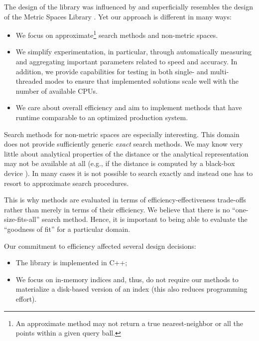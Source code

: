 \documentclass[runningheads,a4paper]{llncs}
\begin{document}
{The design of the library was influenced by 
and superficially resembles the design of the Metric Spaces Library \cite{LibMetricSpace}.
Yet our approach is different in many ways:

\begin{itemize}
\item We focus on approximate\footnote{
An approximate method may not
return a true nearest-neighbor or
 all the points within a given query ball.}
  search methods and non-metric spaces.

\item We simplify experimentation, in particular, 
through automatically measuring and aggregating important parameters
related to speed and accuracy. 
In addition, we provide capabilities for testing in both single- and multi-threaded modes
to ensure that implemented solutions scale well with the number of available CPUs.

\item We care about overall efficiency and
aim to implement methods that have runtime comparable to an optimized production system. 
\end{itemize}

Search methods for non-metric spaces are especially interesting.
This domain does not provide sufficiently generic \emph{exact} search methods.
We may know very little about analytical properties of the distance
or the analytical representation may not be available at all (e.g., if the 
distance is computed by a black-box device \cite{Skopal:2007}).
In many cases it is not possible to search exactly
and instead one has to resort to approximate search procedures.

This is why methods
are evaluated in terms of efficiency-effectiveness trade-offs
rather than merely in terms of their efficiency.
We believe that there is no ``one-size-fits-all'' search method.
Hence, it is important to being able to evaluate the ``goodness of fit''
for a particular  domain.

Our commitment to efficiency affected several design decisions:
\begin{itemize}
\item The library is implemented in C++;
\item We focus on in-memory indices 
and, thus, do not require our methods to materialize a disk-based version of an index
(this also reduces programming effort).


\end{itemize}}
\end{document}
